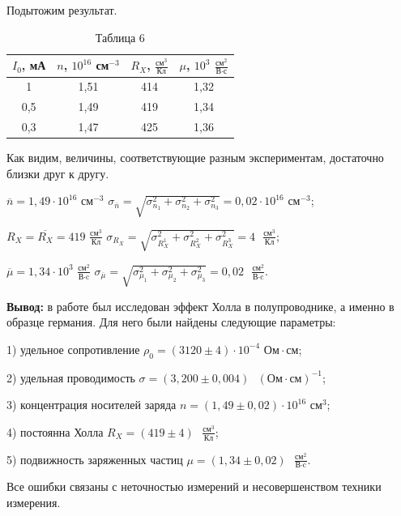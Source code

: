 \documentclass[a4paper,12pt]{article} %
\begin{document}
Подытожим результат.

\begin{table}[h!]
	\centering
	\begin{tabular}{|c|c|c|c|}
		\hline
		$I_0$, мА & $n$, $10^{16}$ см$^{-3}$ & $R_X$,  $\frac{\text{см}^3}{\text{Кл}}$ & $\mu$, $10^3$ $\frac{\text{см}^2}{\text{В}\cdot\text{с}}$ \\ \hline
		1         & 1,51                     & 414                                     & 1,32                                                      \\ \hline
		0,5       & 1,49                     & 419                                     & 1,34                                                      \\ \hline
		0,3       & 1,47                     & 425                                     & 1,36                                                      \\ \hline
	\end{tabular}
	\caption*{Таблица 6}
\end{table}

Как видим, величины, соответствующие разным экспериментам, достаточно близки друг к другу.

$\overline{n} = 1,49 \cdot 10^{16}$ см$^{-3}$ \hspace{20mm} $\sigma_{\overline{n}} = \sqrt{\sigma_{n_1}^2 + \sigma_{n_2}^2 + \sigma_{n_3}^2} = 0,02\cdot 10^{16}$ см$^{-3}$;

\vspace{2mm}
$R_X = \overline{R_X} = 419$ $\frac{\text{см}^3}{\text{Кл}}$ \hspace{18mm} $\sigma_{R_X} = \sqrt{\sigma_{R_{X}^1}^2 + \sigma_{R_{X}^2}^2 + \sigma_{R_{X}^3}^2} = 4 \text{ }\frac{\text{см}^3}{\text{Кл}}$;

\vspace{2mm}
$\overline{\mu} = 1,34 \cdot 10^3$ $\frac{\text{см}^2}{\text{В}\cdot\text{c}}$ \hspace{23mm} $\sigma_{\overline{\mu}} = \sqrt{\sigma_{\mu_1}^2 + \sigma_{\mu_2}^2 + \sigma_{\mu_3}^2} = 0,02\text{ }\frac{\text{см}^2}{\text{В}\cdot\text{c}}$.
\vspace{85mm}

\textbf{{\large Вывод:}} в работе был исследован эффект Холла в полупроводнике, а именно в образце германия. Для него были найдены следующие параметры: 

1) удельное сопротивление $\rho_0 = (3120\pm 4)\cdot 10^{-4}\text{ Ом}\cdot\text{см}$;

2) удельная проводимость $\sigma = (3,200 \pm 0,004) \text{ } (\text{Ом}\cdot\text{см})^{-1}$;
	
3) концентрация носителей заряда $n = (1,49 \pm 0,02)\cdot 10^{16}\text{ см}^3$;

4) постоянна Холла $R_X = (419 \pm 4) \text{ }\frac{\text{см}^3}{\text{Кл}}$;

5) подвижность заряженных частиц $\mu = (1,34 \pm 0,02)\text{ }\frac{\text{см}^2}{\text{В}\cdot\text{c}}$.

\noindent Все ошибки связаны с неточностью измерений и несовершенством техники измерения.
\end{document}
